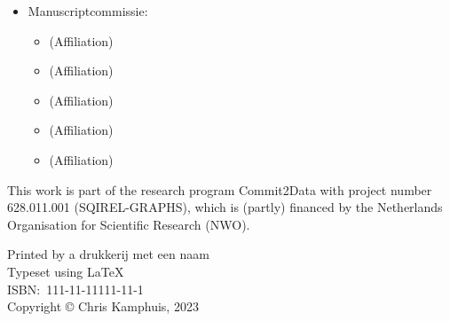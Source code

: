 \begin{itemize}
	\item[] Manuscriptcommissie:
	\begin{itemize}
		\item[]  (Affiliation)
		\item[]  (Affiliation)
		\item[]  (Affiliation)
		\item[]  (Affiliation)
		\item[]  (Affiliation)
	\end{itemize}
\end{itemize}

\vfill

\noindent%
\begin{minipage}[b][][b]{0.95\textwidth} %
	{
		\setlength{\parindent}{0cm}%
		This work is part of the research program Commit2Data with project number 628.011.001 (SQIREL-GRAPHS), which is (partly) financed by the Netherlands Organisation for Scientific Research (NWO).
		
	}
	
	\vspace{0.25cm}
	
	{
		\setlength{\parindent}{0cm}%
		Printed by a drukkerij met een naam\\[\baselineskip]
		Typeset using \LaTeX\\[\baselineskip]
		ISBN:\ 111{-}11{-}11111{-}11{-}1\\[\baselineskip]
		Copyright \copyright{} Chris Kamphuis, 2023\\[\baselineskip]
	}
\end{minipage}%
